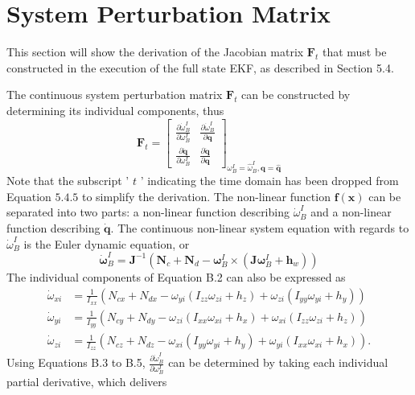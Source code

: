 \chapter{System Perturbation Matrix}
\makeatletter{}\makeatother
\label{appen:derivations_bigramseg}

This section will show the derivation of the Jacobian matrix $\mathbf{F}_{t}$ that must be constructed in the execution of the full state EKF, as described in Section 5.4.

The continuous system perturbation matrix $\mathbf{F}_{t}$ can be constructed by determining its individual components, thus
$$
\mathbf{F}_{t}=\left[\begin{array}{ll}
\frac{\partial \dot{\omega}_{B}^{I}}{\partial \omega_{B}^{I}} & \frac{\partial \dot{\omega}_{B}^{I}}{\partial \mathbf{q}} \\
\frac{\partial \dot{\mathbf{q}}}{\partial \omega_{B}^{I}} & \frac{\partial \dot{\mathbf{q}}}{\partial \mathbf{q}}
\end{array}\right]_{\omega_{B}^{I}=\hat{\omega}_{B}^{I}, \mathbf{q}=\hat{\mathbf{q}}}
$$
Note that the subscript ' $t$ ' indicating the time domain has been dropped from Equation $5.4 .5$ to simplify the derivation. The non-linear function $\boldsymbol{f}(\mathbf{x})$ can be separated into two parts: a non-linear function describing $\dot{\omega}_{B}^{I}$ and a non-linear function describing $\dot{\mathbf{q}}$. The continuous non-linear system equation with regards to $\dot{\omega}_{B}^{I}$ is the Euler dynamic equation, or
$$
\dot{\boldsymbol{\omega}}_{B}^{I}=\mathbf{J}^{-1}\left(\mathbf{N}_{c}+\mathbf{N}_{d}-\boldsymbol{\omega}_{B}^{I} \times\left(\mathbf{J} \boldsymbol{\omega}_{B}^{I}+\mathbf{h}_{w}\right)\right)
$$
The individual components of Equation B.2 can also be expressed as
$$
\begin{aligned}
\dot{\omega}_{x i} &=\frac{1}{I_{x x}}\left(N_{c x}+N_{d x}-\omega_{y i}\left(I_{z z} \omega_{z i}+h_{z}\right)+\omega_{z i}\left(I_{y y} \omega_{y i}+h_{y}\right)\right) \\
\dot{\omega}_{y i} &=\frac{1}{I_{y y}}\left(N_{c y}+N_{d y}-\omega_{z i}\left(I_{x x} \omega_{x i}+h_{x}\right)+\omega_{x i}\left(I_{z z} \omega_{z i}+h_{z}\right)\right) \\
\dot{\omega}_{z i} &=\frac{1}{I_{z z}}\left(N_{c z}+N_{d z}-\omega_{x i}\left(I_{y y} \omega_{y i}+h_{y}\right)+\omega_{y i}\left(I_{x x} \omega_{x i}+h_{x}\right)\right) .
\end{aligned}
$$
Using Equations B.3 to B.5, $\frac{\partial \dot{\omega}_{B}^{I}}{\partial \omega_{B}^{I}}$ can be determined by taking each individual partial derivative, which delivers
